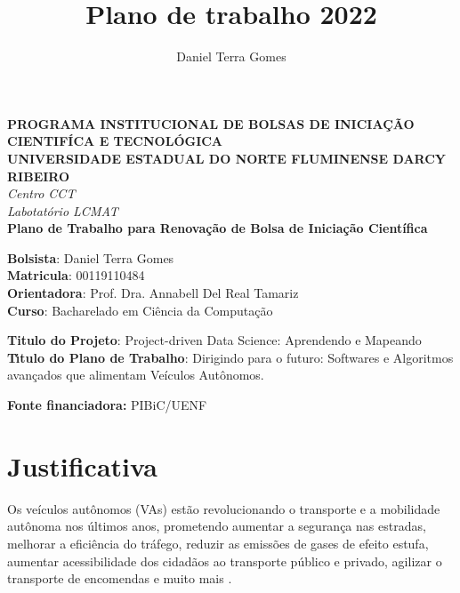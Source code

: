 \documentclass{article}
\title{Plano de trabalho 2022}
\author{Daniel Terra Gomes}
\begin{document}
\begin{titlepage}
\begin{center}
\large
\textbf{PROGRAMA INSTITUCIONAL DE BOLSAS DE INICIA\c{C}\~{A}O CIENTIF\'{I}CA E TECNOL\'{O}GICA\\\vspace{0,5cm}
UNIVERSIDADE ESTADUAL DO NORTE FLUMINENSE DARCY RIBEIRO\\
}
\textit{Centro CCT \\
Labotat\'{o}rio LCMAT\\
\vspace{1cm}}
\vspace{1,5cm}
\textbf{Plano de Trabalho para Renovação de Bolsa de Iniciação Científica}\\\vspace{5cm}
\end{center}
\textbf{Bolsista}: Daniel Terra Gomes\\
\textbf{Matricula}: 00119110484\\
\textbf{Orientadora}: Prof. Dra. Annabell Del Real Tamariz  \\
\textbf{Curso}: Bacharelado em Ci\^{e}ncia da Computa\c{c}\~{a}o\\
\vspace{3cm}
\begin{center}
\textbf{Titulo do Projeto}: Project-driven Data Science: Aprendendo e Mapeando\\
\textbf{T\'{\i}tulo do Plano de Trabalho}: Dirigindo para o futuro: Softwares e Algoritmos avançados que alimentam Veículos Autônomos.

\textbf{Fonte financiadora:} PIBiC/UENF
\end{center}
\end{titlepage}


\section{Justificativa}

Os veículos autônomos (VAs) estão revolucionando o transporte e a mobilidade autônoma nos últimos anos, prometendo aumentar a segurança nas estradas, melhorar a eficiência do tráfego, reduzir as emissões de gases de efeito estufa, aumentar acessibilidade dos cidadãos ao transporte público e privado, agilizar o transporte de encomendas e muito mais \cite{review-auto, intro-pm, mundobrasil}.
\end{document}
